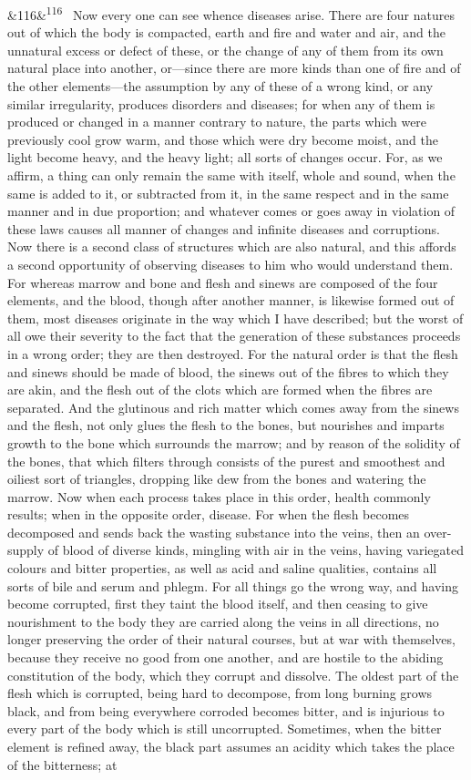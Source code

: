 \documentclass[12pt]{article}
\newcommand{\para}[1][]{\par\noindent\ifx&#1&\else\textsuperscript{\footnotesize #1}~\fi}
\begin{document}
\para[116] Now every one can see whence diseases arise. There are four natures out of which the body is compacted, earth and fire and water and air, and the unnatural excess or defect of these, or the change of any of them from its own natural place into another, or---since there are more kinds than one of fire and of the other elements---the assumption by any of these of a wrong kind, or any similar irregularity, produces disorders and diseases; for when any of them is produced or changed in a manner contrary to nature, the parts which were previously cool grow warm, and those which were dry become moist, and the light become heavy, and the heavy light; all sorts of changes occur. For, as we affirm, a thing can only remain the same with itself, whole and sound, when the same is added to it, or subtracted from it, in the same respect and in the same manner and in due proportion; and whatever comes or goes away in violation of these laws causes all manner of changes and infinite diseases and corruptions. Now there is a second class of structures which are also natural, and this affords a second opportunity of observing diseases to him who would understand them. For whereas marrow and bone and flesh and sinews are composed of the four elements, and the blood, though after another manner, is likewise formed out of them, most diseases originate in the way which I have described; but the worst of all owe their severity to the fact that the generation of these substances proceeds in a wrong order; they are then destroyed. For the natural order is that the flesh and sinews should be made of blood, the sinews out of the fibres to which they are akin, and the flesh out of the clots which are formed when the fibres are separated. And the glutinous and rich matter which comes away from the sinews and the flesh, not only glues the flesh to the bones, but nourishes and imparts growth to the bone which surrounds the marrow; and by reason of the solidity of the bones, that which filters through consists of the purest and smoothest and oiliest sort of triangles, dropping like dew from the bones and watering the marrow. Now when each process takes place in this order, health commonly results; when in the opposite order, disease. For when the flesh becomes decomposed and sends back the wasting substance into the veins, then an over-supply of blood of diverse kinds, mingling with air in the veins, having variegated colours and bitter properties, as well as acid and saline qualities, contains all sorts of bile and serum and phlegm. For all things go the wrong way, and having become corrupted, first they taint the blood itself, and then ceasing to give nourishment to the body they are carried along the veins in all directions, no longer preserving the order of their natural courses, but at war with themselves, because they receive no good from one another, and are hostile to the abiding constitution of the body, which they corrupt and dissolve. The oldest part of the flesh which is corrupted, being hard to decompose, from long burning grows black, and from being everywhere corroded becomes bitter, and is injurious to every part of the body which is still uncorrupted. Sometimes, when the bitter element is refined away, the black part assumes an acidity which takes the place of the bitterness; at 
\end{document}
